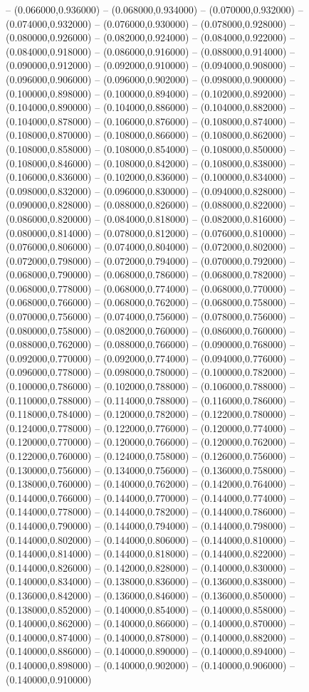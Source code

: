 -- (0.066000,0.936000) -- (0.068000,0.934000) -- (0.070000,0.932000) -- (0.074000,0.932000) -- (0.076000,0.930000) -- (0.078000,0.928000) -- (0.080000,0.926000) -- (0.082000,0.924000) -- (0.084000,0.922000) -- (0.084000,0.918000) -- (0.086000,0.916000) -- (0.088000,0.914000) -- (0.090000,0.912000) -- (0.092000,0.910000) -- (0.094000,0.908000) -- (0.096000,0.906000) -- (0.096000,0.902000) -- (0.098000,0.900000) -- (0.100000,0.898000) -- (0.100000,0.894000) -- (0.102000,0.892000) -- (0.104000,0.890000) -- (0.104000,0.886000) -- (0.104000,0.882000) -- (0.104000,0.878000) -- (0.106000,0.876000) -- (0.108000,0.874000) -- (0.108000,0.870000) -- (0.108000,0.866000) -- (0.108000,0.862000) -- (0.108000,0.858000) -- (0.108000,0.854000) -- (0.108000,0.850000) -- (0.108000,0.846000) -- (0.108000,0.842000) -- (0.108000,0.838000) -- (0.106000,0.836000) -- (0.102000,0.836000) -- (0.100000,0.834000) -- (0.098000,0.832000) -- (0.096000,0.830000) -- (0.094000,0.828000) -- (0.090000,0.828000) -- (0.088000,0.826000) -- (0.088000,0.822000) -- (0.086000,0.820000) -- (0.084000,0.818000) -- (0.082000,0.816000) -- (0.080000,0.814000) -- (0.078000,0.812000) -- (0.076000,0.810000) -- (0.076000,0.806000) -- (0.074000,0.804000) -- (0.072000,0.802000) -- (0.072000,0.798000) -- (0.072000,0.794000) -- (0.070000,0.792000) -- (0.068000,0.790000) -- (0.068000,0.786000) -- (0.068000,0.782000) -- (0.068000,0.778000) -- (0.068000,0.774000) -- (0.068000,0.770000) -- (0.068000,0.766000) -- (0.068000,0.762000) -- (0.068000,0.758000) -- (0.070000,0.756000) -- (0.074000,0.756000) -- (0.078000,0.756000) -- (0.080000,0.758000) -- (0.082000,0.760000) -- (0.086000,0.760000) -- (0.088000,0.762000) -- (0.088000,0.766000) -- (0.090000,0.768000) -- (0.092000,0.770000) -- (0.092000,0.774000) -- (0.094000,0.776000) -- (0.096000,0.778000) -- (0.098000,0.780000) -- (0.100000,0.782000) -- (0.100000,0.786000) -- (0.102000,0.788000) -- (0.106000,0.788000) -- (0.110000,0.788000) -- (0.114000,0.788000) -- (0.116000,0.786000) -- (0.118000,0.784000) -- (0.120000,0.782000) -- (0.122000,0.780000) -- (0.124000,0.778000) -- (0.122000,0.776000) -- (0.120000,0.774000) -- (0.120000,0.770000) -- (0.120000,0.766000) -- (0.120000,0.762000) -- (0.122000,0.760000) -- (0.124000,0.758000) -- (0.126000,0.756000) -- (0.130000,0.756000) -- (0.134000,0.756000) -- (0.136000,0.758000) -- (0.138000,0.760000) -- (0.140000,0.762000) -- (0.142000,0.764000) -- (0.144000,0.766000) -- (0.144000,0.770000) -- (0.144000,0.774000) -- (0.144000,0.778000) -- (0.144000,0.782000) -- (0.144000,0.786000) -- (0.144000,0.790000) -- (0.144000,0.794000) -- (0.144000,0.798000) -- (0.144000,0.802000) -- (0.144000,0.806000) -- (0.144000,0.810000) -- (0.144000,0.814000) -- (0.144000,0.818000) -- (0.144000,0.822000) -- (0.144000,0.826000) -- (0.142000,0.828000) -- (0.140000,0.830000) -- (0.140000,0.834000) -- (0.138000,0.836000) -- (0.136000,0.838000) -- (0.136000,0.842000) -- (0.136000,0.846000) -- (0.136000,0.850000) -- (0.138000,0.852000) -- (0.140000,0.854000) -- (0.140000,0.858000) -- (0.140000,0.862000) -- (0.140000,0.866000) -- (0.140000,0.870000) -- (0.140000,0.874000) -- (0.140000,0.878000) -- (0.140000,0.882000) -- (0.140000,0.886000) -- (0.140000,0.890000) -- (0.140000,0.894000) -- (0.140000,0.898000) -- (0.140000,0.902000) -- (0.140000,0.906000) -- (0.140000,0.910000) 